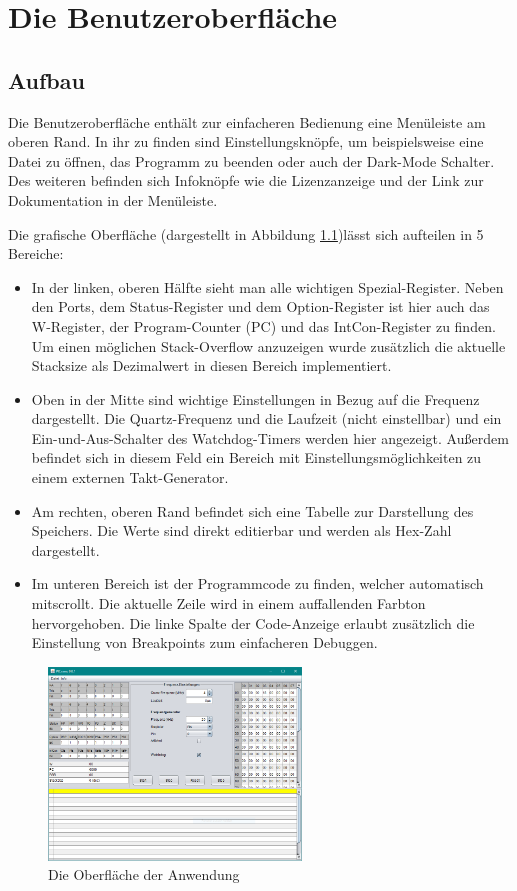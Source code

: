 \chapter{Die Benutzeroberfläche}
\section{Aufbau}
Die Benutzeroberfläche enthält zur einfacheren Bedienung eine Menüleiste am oberen Rand. In ihr zu finden sind Einstellungsknöpfe, um beispielsweise eine Datei zu öffnen, das Programm zu beenden oder auch der Dark-Mode Schalter. Des weiteren befinden sich Infoknöpfe wie die Lizenzanzeige und der Link zur Dokumentation in der Menüleiste. 

\noindent Die grafische Oberfläche (dargestellt in Abbildung \ref{gui})lässt sich aufteilen in 5 Bereiche: 
\begin{itemize}
\item In der linken, oberen Hälfte sieht man alle wichtigen Spezial-Register. Neben den Ports, dem Status-Register und dem Option-Register ist hier auch das W-Register, der Program-Counter (PC) und das IntCon-Register zu finden. Um einen möglichen Stack-Overflow anzuzeigen wurde zusätzlich die aktuelle Stacksize als Dezimalwert in diesen Bereich implementiert. 
\item Oben in der Mitte sind wichtige Einstellungen in Bezug auf die Frequenz dargestellt. Die Quartz-Frequenz und die Laufzeit (nicht einstellbar) und ein Ein-und-Aus-Schalter des Watchdog-Timers werden hier angezeigt. Außerdem befindet sich in diesem Feld ein Bereich mit Einstellungsmöglichkeiten zu einem externen Takt-Generator. 
\item Am rechten, oberen Rand befindet sich eine Tabelle zur Darstellung des Speichers. Die Werte sind direkt editierbar und werden als Hex-Zahl dargestellt. 
\item Im unteren Bereich ist der Programmcode zu finden, welcher automatisch mitscrollt. Die aktuelle Zeile wird in einem auffallenden Farbton hervorgehoben. Die linke Spalte der Code-Anzeige erlaubt zusätzlich die Einstellung von Breakpoints zum einfacheren Debuggen. 
\end{itemize}
\begin{figure}[ht]
	\centering
	\includegraphics[width=0.6\textwidth]{img/gui}
	\caption{Die Oberfläche der Anwendung}
	\label{gui}
\end{figure}

